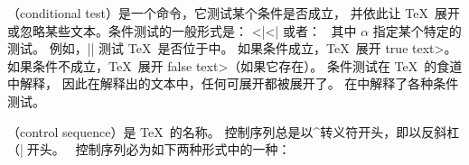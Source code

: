 {{{{{{%
%
{}（conditional test）是一个命令，它测试某个条件是否成立，
并依此让 \TeX\ 展开或忽略某些文本。条件测试的一般形式是：
^^|\else|^^|\fi|
\noindent 或者：\hfil\
\noindent 其中 $\alpha$ 指定某个特定的测试。
例如，|\ifvmode| 测试 \TeX\ 是否位于中。
如果条件成立，\TeX\ 展开 \<true text>。
如果条件不成立，\TeX\ 展开 \<false text>（如果它存在）。
条件测试在 \TeX\ 的食道\seeconcept{\anatomy}中解释，
因此在解释出的文本中，任何可展开都被展开了。
在中解释了各种条件测试。
\endconcept



（control sequence）是 \TeX\ 的名称。
控制序列总是以^{转义符}开头，即以反斜杠（|\|）开头。
\indexchar \
控制序列必为如下两种形式中的一种：

}}}}}}

